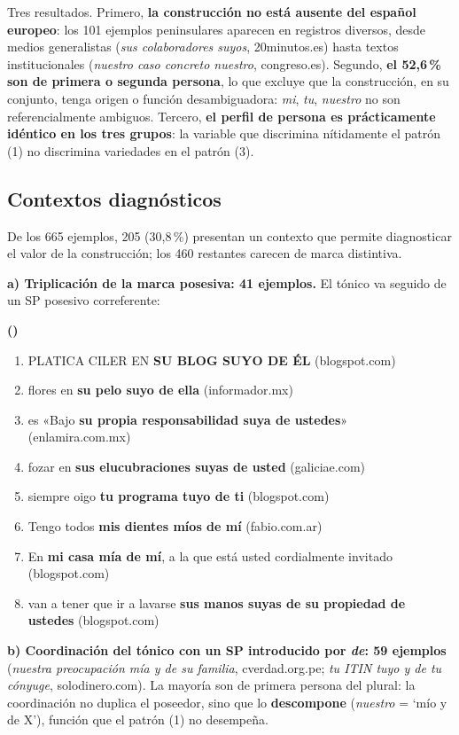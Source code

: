 \documentclass[12pt,a4paper]{article}
\newcounter{exnum}
\newenvironment{exe}{%
  \refstepcounter{exnum}%
  \par\medskip\noindent\textbf{(\theexnum)}\quad\ignorespaces
}{%
  \par\medskip
}
\newenvironment{exlist}{%
  \begin{enumerate}[label=\alph*., leftmargin=2.5em, itemsep=4pt, topsep=4pt]
}{%
  \end{enumerate}
}
\begin{document}
Tres resultados. Primero, \textbf{la construcción no está ausente del español europeo}: los 101 ejemplos peninsulares aparecen en registros diversos, desde medios generalistas (\textit{sus colaboradores suyos}, 20minutos.es) hasta textos institucionales (\textit{nuestro caso concreto nuestro}, congreso.es). Segundo, \textbf{el 52,6\,\% son de primera o segunda persona}, lo que excluye que la construcción, en su conjunto, tenga origen o función desambiguadora: \textit{mi}, \textit{tu}, \textit{nuestro} no son referencialmente ambiguos. Tercero, \textbf{el perfil de persona es prácticamente idéntico en los tres grupos}: la variable que discrimina nítidamente el patrón (1) no discrimina variedades en el patrón (3).

\subsection{Contextos diagnósticos}

De los 665 ejemplos, 205 (30,8\,\%) presentan un contexto que permite diagnosticar el valor de la construcción; los 460 restantes carecen de marca distintiva.

\textbf{a) Triplicación de la marca posesiva: 41 ejemplos.} El tónico va seguido de un SP posesivo correferente:

\begin{exe}
\begin{exlist}
\item PLATICA CILER EN \textbf{SU BLOG SUYO DE ÉL} (blogspot.com)
\item flores en \textbf{su pelo suyo de ella} (informador.mx)
\item es «Bajo \textbf{su propia responsabilidad suya de ustedes}» (enlamira.com.mx)
\item fozar en \textbf{sus elucubraciones suyas de usted} (galiciae.com)
\item siempre oigo \textbf{tu programa tuyo de ti} (blogspot.com)
\item Tengo todos \textbf{mis dientes míos de mí} (fabio.com.ar)
\item En \textbf{mi casa mía de mí}, a la que está usted cordialmente invitado (blogspot.com)
\item van a tener que ir a lavarse \textbf{sus manos suyas de su propiedad de ustedes} (blogspot.com)
\end{exlist}
\end{exe}

\textbf{b) Coordinación del tónico con un SP introducido por \textit{de}: 59 ejemplos} (\textit{nuestra preocupación mía y de su familia}, cverdad.org.pe; \textit{tu ITIN tuyo y de tu cónyuge}, solodinero.com). La mayoría son de primera persona del plural: la coordinación no duplica el poseedor, sino que lo \textbf{descompone} (\textit{nuestro} = `mío y de X'), función que el patrón (1) no desempeña.
\end{document}
